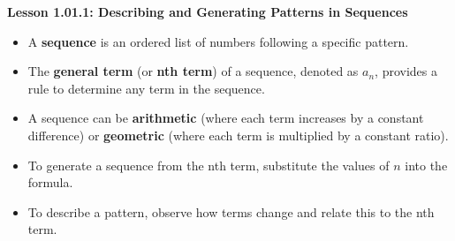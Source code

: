 \begin{center}
\textbf{Lesson 1.01.1: Describing and Generating Patterns in Sequences}
\end{center}

\vspace*{-1.5ex}

\begin{itemize}
    \item A \textbf{sequence} is an ordered list of numbers following a specific pattern.
    \item The \textbf{general term} (or \textbf{nth term}) of a sequence, denoted as $a_n$, provides a rule to determine any term in the sequence.
    \item A sequence can be \textbf{arithmetic} (where each term increases by a constant difference) or \textbf{geometric} (where each term is multiplied by a constant ratio).
    \item To generate a sequence from the nth term, substitute the values of $n$ into the formula.
    \item To describe a pattern, observe how terms change and relate this to the nth term.
\end{itemize}